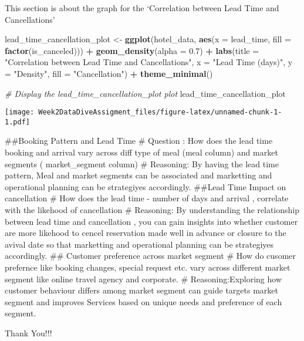 \documentclass[
]{article}
\newenvironment{Shaded}{\begin{snugshade}}{\end{snugshade}}
\newcommand{\AttributeTok}[1]{\textcolor[rgb]{0.13,0.29,0.53}{#1}}
\newcommand{\CommentTok}[1]{\textcolor[rgb]{0.56,0.35,0.01}{\textit{#1}}}
\newcommand{\FloatTok}[1]{\textcolor[rgb]{0.00,0.00,0.81}{#1}}
\newcommand{\FunctionTok}[1]{\textcolor[rgb]{0.13,0.29,0.53}{\textbf{#1}}}
\newcommand{\NormalTok}[1]{#1}
\newcommand{\OtherTok}[1]{\textcolor[rgb]{0.56,0.35,0.01}{#1}}
\newcommand{\SpecialCharTok}[1]{\textcolor[rgb]{0.81,0.36,0.00}{\textbf{#1}}}
\newcommand{\StringTok}[1]{\textcolor[rgb]{0.31,0.60,0.02}{#1}}
\begin{document}
This section is about the graph for the `Correlation between Lead Time
and Cancellations'

\begin{Shaded}
\begin{Highlighting}[]
\NormalTok{lead\_time\_cancellation\_plot }\OtherTok{\textless{}{-}} \FunctionTok{ggplot}\NormalTok{(hotel\_data, }\FunctionTok{aes}\NormalTok{(}\AttributeTok{x =}\NormalTok{ lead\_time, }\AttributeTok{fill =} \FunctionTok{factor}\NormalTok{(is\_canceled))) }\SpecialCharTok{+}
  \FunctionTok{geom\_density}\NormalTok{(}\AttributeTok{alpha =} \FloatTok{0.7}\NormalTok{) }\SpecialCharTok{+}
  \FunctionTok{labs}\NormalTok{(}\AttributeTok{title =} \StringTok{"Correlation between Lead Time and Cancellations"}\NormalTok{,}
       \AttributeTok{x =} \StringTok{"Lead Time (days)"}\NormalTok{,}
       \AttributeTok{y =} \StringTok{"Density"}\NormalTok{,}
       \AttributeTok{fill =} \StringTok{"Cancellation"}\NormalTok{) }\SpecialCharTok{+}
  \FunctionTok{theme\_minimal}\NormalTok{()}

\CommentTok{\# Display the lead\_time\_cancellation\_plot plot}
\NormalTok{lead\_time\_cancellation\_plot}
\end{Highlighting}
\end{Shaded}

\texttt{[image: Week2DataDiveAssigment\_files/figure-latex/unnamed-chunk-1-1.pdf]}

\#\#Booking Pattern and Lead Time \# Question : How does the lead time
booking and arrival vary across diff type of meal (meal column) and
market segments ( market\_segment column) \# Reasoning: By having the
lead time pattern, Meal and market segments can be associated and
marketting and operational planning can be strategiyes accordingly.
\#\#Lead Time Impact on cancellation \# How does the lead time - number
of days and arrival , correlate with the likehood of cancellation \#
Reasoning: By understanding the relationship between lead time and
cancellation , you can gain insights into whether customer are more
likehood to cencel reservation made well in advance or closure to the
avival date so that marketting and operational planning can be
strategiyes accordingly. \#\# Customer preference across market segment
\# How do cusomer prefernce like booking changes, special request etc.
vary across different market segment like online travel agency and
corporate. \# Reasoning:Exploring how customer behaviour differs among
market segment can guide targets market segment and improves Services
based on unique needs and preference of each segment.

Thank You!!!
\end{document}
